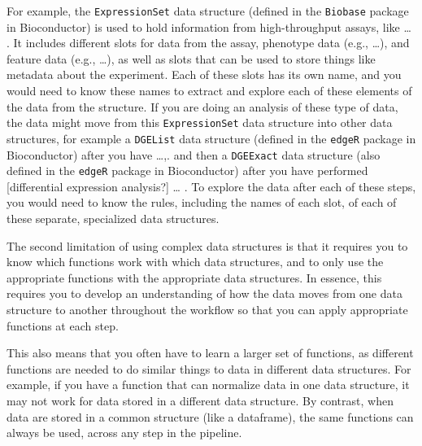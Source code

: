 \documentclass[]{tufte-book}
\begin{document}
For example, the \texttt{ExpressionSet} data structure (defined in the \texttt{Biobase}
package in Bioconductor) is used to hold information from high-throughput
assays, like \ldots{} . It includes different slots for data from the assay,
phenotype data (e.g., \ldots), and feature data (e.g., \ldots), as well as slots that
can be used to store things like metadata about the experiment. Each of these
slots has its own name, and you would need to know these names to extract and
explore each of these elements of the data from the structure. If you are doing
an analysis of these type of data, the data might move from this \texttt{ExpressionSet}
data structure into other data structures, for example a \texttt{DGEList} data
structure (defined in the \texttt{edgeR} package in Bioconductor) after you have \ldots,.
and then a \texttt{DGEExact} data structure (also defined in the \texttt{edgeR} package in
Bioconductor) after you have performed {[}differential expression analysis?{]} \ldots{} .
To explore the data after each of these steps, you would need to know the rules,
including the names of each slot, of each of these separate, specialized data
structures.

The second limitation of using complex data structures is that it requires you
to know which functions work with which data structures, and to only use the
appropriate functions with the appropriate data structures. In essence, this
requires you to develop an understanding of how the data moves from one
data structure to another throughout the workflow so that you can apply appropriate
functions at each step.

This also means that you often have to learn a larger set of functions, as
different functions are needed to do similar things to data in different data
structures. For example, if you have a function that can normalize data in one
data structure, it may not work for data stored in a different data structure.
By contrast, when data are stored in a common structure (like a dataframe), the
same functions can always be used, across any step in the pipeline.
\end{document}
